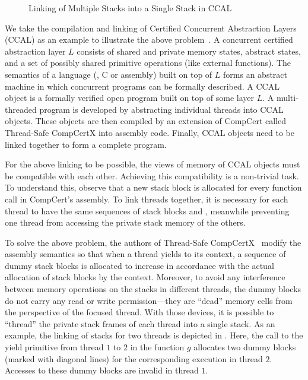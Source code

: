 \begin{wrapfigure}[12]{r}{0.5\textwidth}
  \vspace{-0.2cm}
  \caption{\scriptsize{}Linking of Multiple Stacks into a Single Stack in CCAL}
  \vspace{-0.2cm}
  \label{fig:stack-linking}
\end{wrapfigure}

We take the compilation and linking of Certified Concurrent
Abstraction Layers (CCAL) as an example to illustrate the above
problem~\cite{ccal18}. A concurrent certified abstraction layer $L$
consists of shared and private memory states, abstract states, and a
set of possibly shared primitive operations (like external
functions). The semantics of a language (\eg, C or assembly) built on
top of $L$ forms an abstract machine in which concurrent programs can
be formally described. 
%
A CCAL object is a formally verified open program built on top of some
layer $L$. A multi-threaded program is developed by abstracting
individual threads into CCAL objects. These objects are then
compiled by an extension of CompCert called Thread-Safe CompCertX into
assembly code. Finally, CCAL objects need to be linked together to
form a complete program. 

For the above linking to be possible, the views of memory of CCAL
objects must be compatible with each other. Achieving this
compatibility is a non-trivial task.
%
To understand this, observe that a new stack block is
allocated for every function call in CompCert's assembly. To
link threads together, it is necessary for each thread to have
the same sequences of
stack blocks and \nextblock, meanwhile preventing one
thread from accessing the private stack memory of the others.

To solve the above problem, the authors of Thread-Safe
CompCertX~\cite{ccal18} modify the assembly semantics so that when a
thread yields to its context, a sequence of dummy stack blocks is
allocated to increase \nextblock in accordance with the actual
allocation of stack blocks by the context. Moreover, to avoid any
interference between memory operations on the stacks in different
threads, the dummy blocks do not carry any read or write
permission---they are ``dead'' memory cells from the perspective of
the focused thread. With those devices, it is possible to ``thread''
the private stack frames of each thread into a single stack. As an
example, the linking of stacks for two threads is depicted in
. Here, the call to the yield primitive from
thread $1$ to $2$ in the function $g$ allocates two dummy blocks
(marked with diagonal lines) for the corresponding execution in thread
$2$. Accesses to these dummy blocks are invalid in thread $1$.


